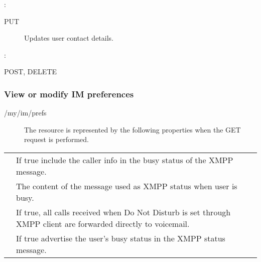 \documentclass[letterpaper,10pt,english]{sphinxmanual}
\begin{document}
:

\begin{sphinxVerbatim}[commandchars=\\\{\}]
\end{sphinxVerbatim}
\begin{description}
\item[{ PUT}] \leavevmode
Updates user contact details.

\end{description}

:

\begin{sphinxVerbatim}[commandchars=\\\{\}]
\end{sphinxVerbatim}

 POST, DELETE


\subsubsection{View or modify IM preferences}
\label{\detokenize{restapi:view-or-modify-im-preferences}}
 /my/im/prefs
\begin{description}
\item[{}] \leavevmode
The resource is represented by the following properties when the GET request is performed.

\end{description}


\begin{savenotes}\sphinxattablestart
\centering
\begin{tabulary}{\linewidth}[t]{|T|T|}
\hline

&
\\
\hline
{}
&
If true include the caller info in the busy status of the XMPP message.
\\
\hline
{}
&
The content of the message used as XMPP status when user is busy.
\\
\hline
{}
&
If true, all calls received when Do Not Disturb is set through XMPP client are forwarded directly to voicemail.
\\
\hline
{}
&
If true advertise the user’s busy status in the XMPP status message.
\\
\hline
\end{tabulary}
\par
\sphinxattableend\end{savenotes}
\end{document}
